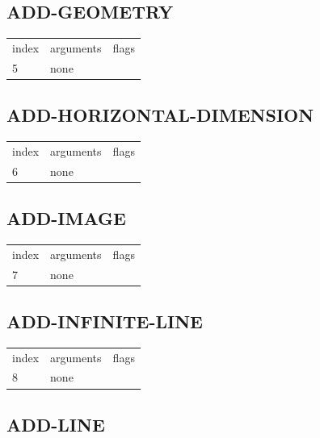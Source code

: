 \documentclass[a4paper]{report}
\begin{document}
\subsection{ADD-GEOMETRY}

\begin{center}
\begin{tabular}{l | l | l}
index & arguments & flags \\
5 & none & 
\end{tabular}
\end{center}

\subsection{ADD-HORIZONTAL-DIMENSION}

\begin{center}
\begin{tabular}{l | l | l}
index & arguments & flags \\
6 & none & 
\end{tabular}
\end{center}

\subsection{ADD-IMAGE}

\begin{center}
\begin{tabular}{l | l | l}
index & arguments & flags \\
7 & none & 
\end{tabular}
\end{center}

\subsection{ADD-INFINITE-LINE}

\begin{center}
\begin{tabular}{l | l | l}
index & arguments & flags \\
8 & none & 
\end{tabular}
\end{center}

\subsection{ADD-LINE}
\end{document}
